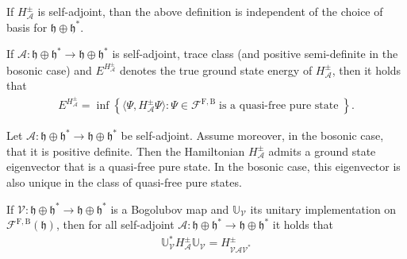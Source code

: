 \begin{proposition}
	If $H_{\mathcal{A}}^\pm$ is self-adjoint, than the above definition is independent of the
	choice of basis for $\mathfrak{h}\oplus\mathfrak{h}^*$.
\end{proposition}

\begin{theorem}
	If $\mathcal{A}:\mathfrak{h}\oplus\mathfrak{h}^*\to\mathfrak{h}\oplus\mathfrak{h}^*$ is
	self-adjoint, trace class (and positive semi-definite in the bosonic case) and
	$E^{H^\pm_{\mathcal{A}}}$ denotes the true ground state energy of $H^\pm_{\mathcal{A}}$,
	then it holds that
	\begin{align*}
		E^{H^\pm_{\mathcal{A}}} = \inf\left\{
			\langle\Psi,H^\pm_{\mathcal{A}}\Psi\rangle : \Psi\in\mathcal{F}^{\mathrm{F,B}}
			\;\text{is a quasi-free pure state}\;
		\right\}.
	\end{align*}
\end{theorem}

\begin{theorem}
	\label{quadratic-ground-state}
	Let $\mathcal{A}:\mathfrak{h}\oplus\mathfrak{h}^*\to\mathfrak{h}\oplus\mathfrak{h}^*$ be
	self-adjoint. Assume moreover, in the bosonic case, that it is positive definite. Then
	the Hamiltonian $H^\pm_{\mathcal{A}}$ admits a ground state eigenvector that is a
	quasi-free pure state. In the bosonic case, this eigenvector is also unique in the class
	of quasi-free pure states.
\end{theorem}

\begin{theorem}
	If $\mathcal{V}:\mathfrak{h}\oplus\mathfrak{h}^*\to\mathfrak{h}\oplus\mathfrak{h}^*$ is
	a Bogolubov map and $\mathbb{U}_{\mathcal{V}}$ its unitary implementation on
	$\mathcal{F}^{\mathrm{F,B}}(\mathfrak{h})$, then for all self-adjoint $\mathcal{A}:
	\mathfrak{h}\oplus\mathfrak{h}^*\to\mathfrak{h}\oplus\mathfrak{h}^*$ it holds that
	\begin{align*}
		\mathbb{U}_{\mathcal{V}}^*H^\pm_{\mathcal{A}}\mathbb{U}_{\mathcal{V}}
		= H^\pm_{\mathcal{VAV}^*}
	\end{align*}
\end{theorem}

